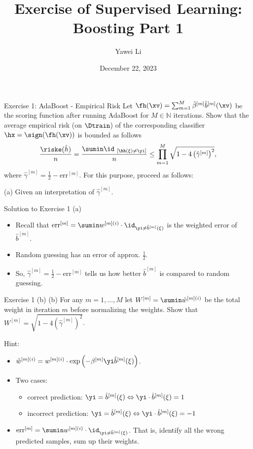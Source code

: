 \documentclass[aspectratio=169]{beamer}
\title[]{\textbf{Exercise of Supervised Learning: \\ Boosting Part 1}}
\author{Yawei Li}
\institute[LMU]
{
\\
  \texttt{yawei.li@stat.uni-muenchen.de}
}
\date{December 22, 2023}
\newcommand{\betahm}{\hat{\beta}^{[m]}}
\newcommand{\bhm}{\hat{b}^{[m]}}
\newcommand{\gammahm}{\hat{\gamma}^{[m]}}
\newcommand{\idhxneqy}{\id_{\ [\hh\left(\xi\right) \neq \yi]}}
\newcommand{\errm}{\mathrm{err}^{[m]}}
\newcommand{\summM}{\sum_{m=1}^M}
\newcommand{\prodmM}{\prod_{m=1}^M}
\newcommand{\Wm}{W^{[m]}}
\newcommand{\wmi}{w^{[m] (i)}}
\newcommand{\wtmi}{\tilde{w}^{[m](i)}}
\newcommand{\betam}{\beta^{[m]}}
\begin{document}
\begin{frame}
\titlepage

\end{frame}



\begin{frame}{Exercise 1: AdaBoost - Empirical Risk}
	Let $\fh(\xv) = \summM \betahm \bhm (\xv) $ be the scoring function after running AdaBoost for $M \in \mathbb{N}$ iterations. Show that the average empirical risk (on $\Dtrain$) of the corresponding classifier $\hx = \sign (\fh(\xv))$ is bounded as follows
	\begin{align}
		\frac{\riske (\hat{h})}{n} = \frac{\sumin \idhxneqy}{n} \leq \prodmM \sqrt{1 - 4 \left(\gammahm\right)^2},
	\end{align}
	where $\gammahm = \frac{1}{2} - \errm$. For this purpose, proceed as follows:
	
	(a) Given an interpretation of $\gammahm$.
\end{frame}

\begin{frame}{Solution to Exercise 1 (a)}
	\begin{itemize}
		\item<1-> Recall that $\errm = \sumin \wmi \cdot \id_{\yi \neq \bhm(\xi)}$ is the weighted error of $\bhm$.
		\item<2-> Random guessing has an error of approx. $\frac{1}{2}$.
		\item<3-> So, $\gammahm = \frac{1}{2} - \errm$ tells us how better $\bhm$ is compared to random guessing.
	\end{itemize}
	
\end{frame}

\begin{frame}{Exercise 1 (b)}
	(b) For any $m = 1, \ldots, M$ let $\Wm = \sumin \wtmi$ be the total weight in iteration $m$ before normalizing the weights. Show that $\Wm = \sqrt{1 - 4\left(\gammahm \right)^2}$.
	
	Hint:
	\begin{itemize}
		\item $\wtmi = \wmi \cdot \exp \left( - \betam \yi \bhm(\xi) \right)$.
		\item<2-> Two cases: 
			\begin{itemize}
				\item correct prediction: $\yi = \bhm(\xi) \Leftrightarrow \yi \cdot \bhm(\xi) = 1$
				\item incorrect prediction: $\yi = \bhm(\xi) \Leftrightarrow \yi \cdot \bhm(\xi) = -1$
			\end{itemize}
		\item<3-> $\errm = \sumin \wmi \cdot \id_{\yi \neq \bhm(\xi)}$. That is, identify all the wrong predicted samples, sum up their weights.
		
	\end{itemize}
\end{frame}
\end{document}
